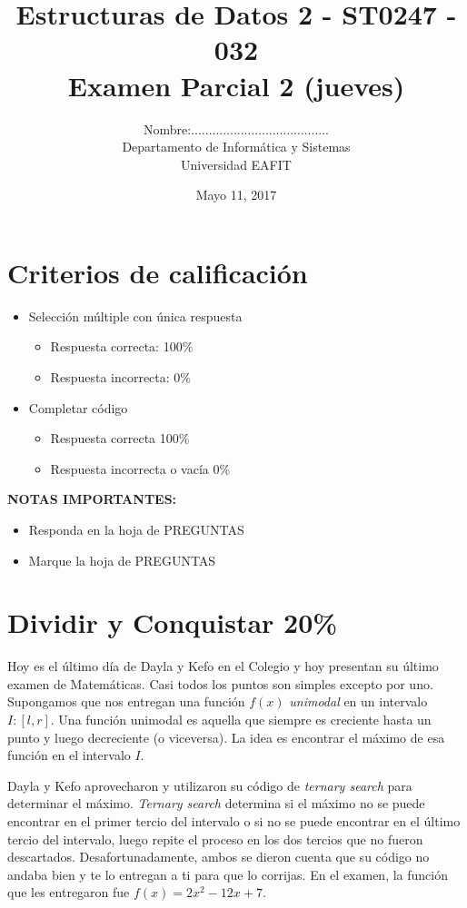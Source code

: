 \documentclass[twocolumn]{article}
\author{
Nombre:....................................... \\
    Departamento de Informática y Sistemas \\
    Universidad EAFIT \\
}
\title{
    Estructuras de Datos 2 - ST0247 - 032 \\
    Examen Parcial 2 (jueves)
}
\date{
    Mayo 11, 2017
}
\begin{document}
\vspace{-5cm}
\maketitle


\section*{Criterios de calificación}

\begin{itemize}
\item Selección múltiple con única respuesta
\begin{itemize}
\item Respuesta correcta: 100\%
\item Respuesta incorrecta: 0\%
\end{itemize}

\item Completar código
\begin{itemize}
\item Respuesta correcta 100\%
\item Respuesta incorrecta o vacía 0\%
\end{itemize}
\end{itemize}

\textbf{NOTAS IMPORTANTES:}
\begin{itemize}
	\item Responda en la hoja de PREGUNTAS
	\item Marque la hoja de PREGUNTAS
\end{itemize}

\section{Dividir y Conquistar 20\%}
Hoy es el último día de Dayla y Kefo en el Colegio y hoy presentan su último examen de Matemáticas. Casi todos los puntos son simples excepto por uno. Supongamos que nos entregan una función $f(x)$ \textit{unimodal} en un intervalo $I: [l, r]$. Una función unimodal es aquella que siempre es creciente hasta un punto y luego decreciente (o viceversa). La idea es encontrar el máximo  de esa función en el intervalo $I$. 

Dayla y Kefo aprovecharon y utilizaron su código de \textit{ternary search} para determinar el máximo. \textit{Ternary search} determina si el máximo no se puede encontrar en el primer tercio del intervalo o si no se puede encontrar en el último tercio
del intervalo, luego repite el proceso en los dos tercios que no fueron descartados. Desafortunadamente, ambos se dieron cuenta que su código no andaba bien y te lo entregan a ti para que lo corrijas. En el examen, la función que les entregaron fue $f(x) = 2x^2 - 12x + 7$.\\
\end{document}
